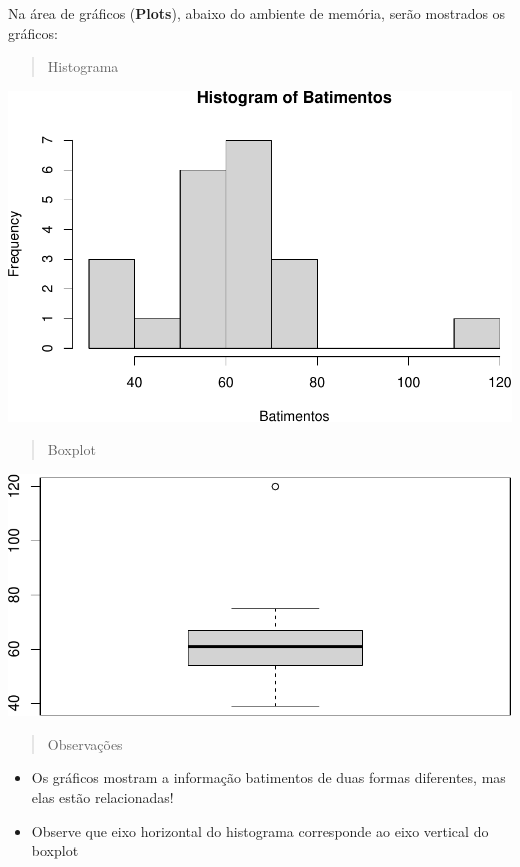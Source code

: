 \documentclass[
]{book}
\begin{document}
Na área de gráficos (\textbf{Plots}), abaixo do ambiente de memória, serão mostrados os gráficos:

\begin{quote}
Histograma
\end{quote}

\includegraphics{LivroEstatisticaR_files/figure-latex/unnamed-chunk-14-1.pdf}

\begin{quote}
Boxplot
\end{quote}

\includegraphics{LivroEstatisticaR_files/figure-latex/unnamed-chunk-15-1.pdf}

\begin{quote}
Observações
\end{quote}

\begin{itemize}
\item
  Os gráficos mostram a informação batimentos de duas formas diferentes, mas elas estão relacionadas!
\item
  Observe que eixo horizontal do histograma corresponde ao eixo vertical do boxplot
\end{itemize}
\end{document}
